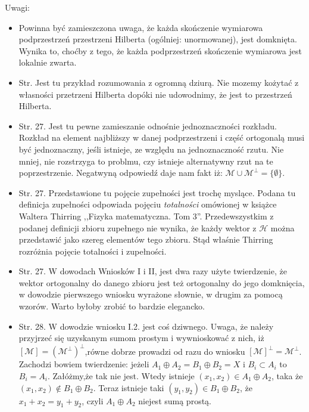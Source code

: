 \documentclass[a4paper,11pt]{article}
\begin{document}
Uwagi:
\begin{itemize}
\item Powinna być zamieszczona uwaga, że każda skończenie wymiarowa
  podprzestrzeń przestrzeni Hilberta (ogólniej: unormowanej), jest
  domknięta. Wynika to, choćby z tego, że każda podprzestrzeń
  skończenie wymiarowa jest lokalnie zwarta.
\item Str. Jest tu przykład rozumowania z ogromną dziurą. Nie mozemy
  kożytać z własności przetrzeni Hilberta dopóki nie udowodnimy, że
  jest to przestrzeń Hilberta.
\item Str. 27. Jest tu pewne zamieszanie odnośnie jednoznaczności
  rozkładu. Rozkład na element najbliższy w danej podprzestrzeni i
  część ortogonalą musi być jednoznaczny, jeśli istnieje, ze względu
  na jednoznaczność rzutu. Nie mniej, nie rozstrzyga to problmu, czy
  istnieje alternatywny rzut na te poprzestrzenie. Negatwyną odpowiedź
  daje nam fakt iż:
  $\mathcal{ M } \cup \mathcal{ M }^{ \bot } = \{ \emptyset \}$.
\item Str. 27. Przedstawione tu pojęcie zupełności jest trochę
  myslące. Podana tu definicja zupełności odpowiada pojęciu
  \emph{totalności} omówionej w książce Waltera Thirring ,,Fizyka
  matematyczna. Tom 3''. Przedewszystkim z podanej definicji zbioru
  zupełnego nie wynika, że każdy wektor z $\mathcal{ H }$ można
  przedstawić jako szereg elementów tego zbioru. Stąd właśnie Thirring
  rozróżnia pojęcie totalności i zupełności.
\item Str. 27. W dowodach Wniosków I i II, jest dwa razy użyte
  twierdzenie, że wektor ortogonalny do danego zbioru jest też
  ortogonalny do jego domknięcia, w dowodzie pierwszego wniosku
  wyrażone słownie, w drugim za pomocą wzorów. Warto byłoby zrobić to
  bardzie elegancko.
\item Str. 28. W dowodzie wniosku I.2. jest coś dziwnego. Uwaga, że
  należy przyjrzeć się uzyskanym sumom prostym i wywnioskować z nich,
  iż $[ \mathcal{ M } ]=( \mathcal{ M }^{ \bot } )^{ \bot }$,równe
  dobrze prowadzi od razu do wniosku
  $[ \mathcal{ M } ]^{ \bot } = \mathcal{ M }^{ \bot }$. Zachodzi
  bowiem twierdzenie: jeżeli
  $A_{ 1 } \oplus A_{ 2 } = B_{ 1 } \oplus B_{ 2 } = X$ i
  $B_{ i } \subset A_{ i }$ to $B_{ i } = A_{ i }$. Załóżmy,że tak nie
  jest. Wtedy istnieje
  $( x_{ 1 }, x_{ 2 } ) \in A_{ 1 } \oplus A_{ 2 }$, taka że
  $( x_{ 1 }, x_{ 2 } ) \notin B_{ 1 } \oplus B_{ 2 }$. Teraz istnieje
  taki $( y_{ 1 }, y_{ 2 } ) \in B_{ 1 } \oplus B_{ 2 }$, że
  $x_{ 1 } + x_{ 2 } = y_{ 1 } + y_{ 2 }$, czyli
  $A_{ 1 } \oplus A_{ 2 }$ niejest sumą prostą.

\end{itemize}
\end{document}
